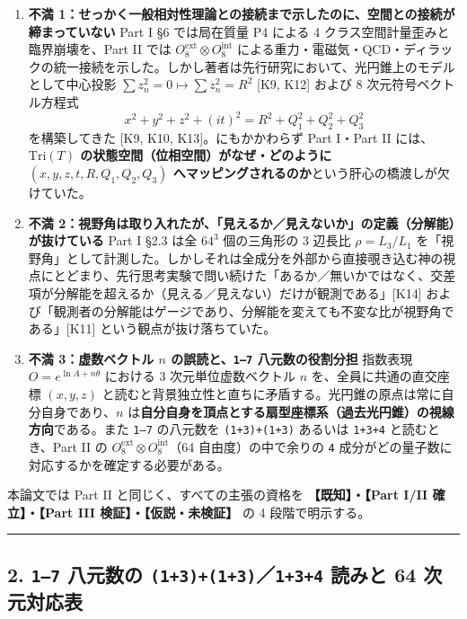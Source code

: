 \documentclass[
  a4paper,
]{ltjsarticle}
\begin{document}
\begin{enumerate}
\def\labelenumi{\arabic{enumi}.}
\item
  \textbf{不満
  1：せっかく一般相対性理論との接続まで示したのに、空間との接続が締まっていない}
  Part I §6 では局在質量 P4 による 4
  クラス空間計量歪みと臨界崩壊を、Part II では
  \(O_8^{\mathrm{ext}} \otimes O_8^{\mathrm{int}}\)
  による重力・電磁気・QCD・ディラックの統一接続を示した。しかし著者は先行研究において、光円錐上のモデルとして中心投影
  \(\sum z_n^2 = 0 \mapsto \sum z_n^2 = R^2\) {[}K9, K12{]} および 8
  次元符号ベクトル方程式
  \[x^2 + y^2 + z^2 + (it)^2 = R^2 + Q_1^2 + Q_2^2 + Q_3^2 \tag{1}\]
  を構築してきた {[}K9, K10, K13{]}。にもかかわらず Part I・Part II
  には、\textbf{\(\mathrm{Tri}(T)\)
  の状態空間（位相空間）がなぜ・どのように
  \((x, y, z, t, R, Q_1, Q_2, Q_3)\)
  へマッピングされるのか}という肝心の橋渡しが欠けていた。
\item
  \textbf{不満
  2：視野角は取り入れたが、「見えるか／見えないか」の定義（分解能）が抜けている}
  Part I §2.3 は全 \(64^3\) 個の三角形の 3 辺長比 \(\rho = L_3/L_1\)
  を「視野角」として計測した。しかしそれは全成分を外部から直接覗き込む神の視点にとどまり、先行思考実験で問い続けた「あるか／無いかではなく、交差項が分解能を超えるか（見える／見えない）だけが観測である」{[}K14{]}
  および「観測者の分解能はゲージであり、分解能を変えても不変な比が視野角である」{[}K11{]}
  という観点が抜け落ちていた。
\item
  \textbf{不満 3：虚数ベクトル \(n\) の誤読と、\texttt{1–7}
  八元数の役割分担} 指数表現 \(O = e^{\ln A + n\theta}\) における 3
  次元単位虚数ベクトル \(n\) を、全員に共通の直交座標 \((x, y, z)\)
  と読むと背景独立性と直ちに矛盾する。光円錐の原点は常に自分自身であり、\(n\)
  は\textbf{自分自身を頂点とする扇型座標系（過去光円錐）の視線方向}である。また
  \texttt{1–7} の八元数を \texttt{(1+3)+(1+3)} あるいは \texttt{1+3+4}
  と読むとき、Part II の
  \(O_8^{\mathrm{ext}} \otimes O_8^{\mathrm{int}}\)（64
  自由度）の中で余りの \texttt{4}
  成分がどの量子数に対応するかを確定する必要がある。
\end{enumerate}

本論文では Part II と同じく、すべての主張の資格を
\textbf{【既知】・【Part I/II 確立】・【Part III
検証】・【仮説・未検証】} の 4 段階で明示する。

\begin{center}\rule{0.5\linewidth}{0.5pt}\end{center}

\subsection{\texorpdfstring{2. \texttt{1–7} 八元数の
\texttt{(1+3)+(1+3)}／\texttt{1+3+4} 読みと 64
次元対応表}{2. 1--7 八元数の (1+3)+(1+3)／1+3+4 読みと 64 次元対応表}}\label{ux516bux5143ux6570ux306e-1313134-ux8aadux307fux3068-64-ux6b21ux5143ux5bfeux5fdcux8868}
\end{document}
